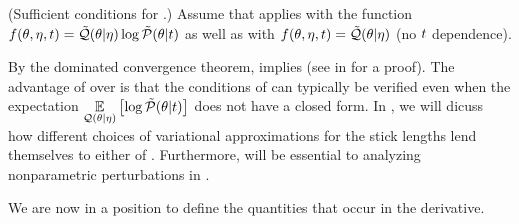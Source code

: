 %
\begin{assu}
(Sufficient conditions for .)
%
Assume that  applies with the function $f(\theta,
\eta, t) = \tilde{\mathcal{Q}}(\theta \vert \eta) \log \tilde{\mathcal{P}}(\theta \vert t)$ as well as
with $f(\theta, \eta, t) = \tilde{\mathcal{Q}}(\theta \vert \eta)$ (no $t$ dependence).
%
\end{assu}

By the dominated convergence theorem,  implies
 (see  in  for a
proof). The advantage of  over
 is that the conditions of 
can typically be verified even when the expectation $\underset{\mathcal{Q}(\theta \vert
\eta)}{\mathbb{E}}\left[\log \tilde{\mathcal{P}}(\theta \vert t)\right]$ does not have a closed form.  In
, we will dicuss how different choices of
variational approximations for the stick lengths lend themselves to either
 of .  Furthermore,
 will be essential to analyzing nonparametric
perturbations in .

We are now in a position to define the quantities that occur in the derivative.

